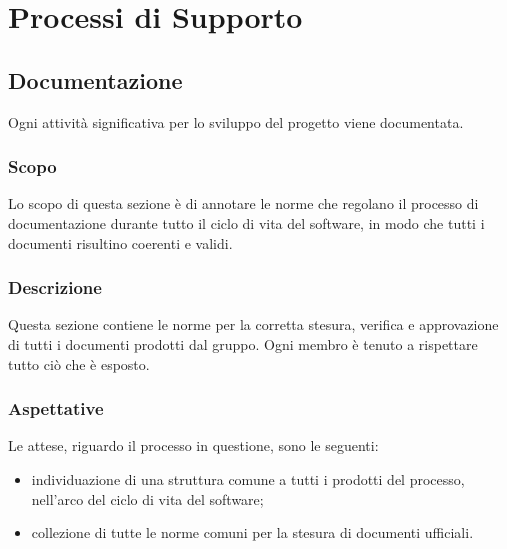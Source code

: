 \section{Processi di Supporto}
    \subsection{Documentazione}
    Ogni attività significativa per lo sviluppo del progetto viene documentata.
        \subsubsection{Scopo}
        Lo scopo di questa sezione è di annotare le norme che regolano il processo di documentazione durante tutto il ciclo di vita del software, in modo che tutti i documenti risultino coerenti e validi.
        \subsubsection{Descrizione}
        Questa sezione contiene le norme per la corretta stesura, verifica e approvazione di tutti i documenti prodotti dal gruppo. Ogni membro è tenuto a rispettare tutto ciò che è esposto.
        \subsubsection{Aspettative}
        Le attese, riguardo il processo in questione, sono le seguenti:
        \begin{itemize}
            \item individuazione di una struttura comune a tutti i prodotti del processo, nell’arco del ciclo di vita del software;
            \item collezione di tutte le norme comuni per la stesura di documenti ufficiali.
        \end{itemize}
